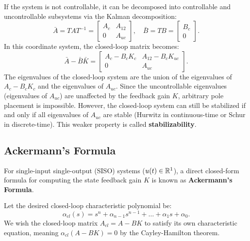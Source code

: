 If the system is not controllable, it can be decomposed into controllable and uncontrollable subsystems via the Kalman decomposition:
\begin{equation}
\bar{A} = T A T^{-1} = \begin{bmatrix} A_c & A_{12} \\ 0 & A_{uc} \end{bmatrix}, \quad \bar{B} = T B = \begin{bmatrix} B_c \\ 0 \end{bmatrix} .
\end{equation}
In this coordinate system, the closed-loop matrix becomes:
\begin{equation}
\bar{A} - \bar{B} \bar{K} = \begin{bmatrix} A_c - B_c K_c & A_{12} - B_c K_{uc} \\ 0 & A_{uc} \end{bmatrix} .
\end{equation}
The eigenvalues of the closed-loop system are the union of the eigenvalues of $A_c - B_c K_c$ and the eigenvalues of $A_{uc}$. Since the uncontrollable eigenvalues (eigenvalues of $A_{uc}$) are unaffected by the feedback gain $K$, arbitrary pole placement is impossible. However, the closed-loop system can still be stabilized if and only if all eigenvalues of $A_{uc}$ are stable (Hurwitz in continuous-time or Schur in discrete-time). This weaker property is called \textbf{stabilizability}.

\subsection{Ackermann's Formula}
For single-input single-output (SISO) systems ($u(t) \in \mathbb{R}^1$), a direct closed-form formula for computing the state feedback gain $K$ is known as \textbf{Ackermann's Formula}.

Let the desired closed-loop characteristic polynomial be:
\begin{equation}
\alpha_{cl}(s) = s^n + \alpha_{n-1} s^{n-1} + \dots + \alpha_1 s + \alpha_0 .
\end{equation}
We wish the closed-loop matrix $A_{cl} = A - B K$ to satisfy its own characteristic equation, meaning $\alpha_{cl}(A - B K) = 0$ by the Cayley-Hamilton theorem.

